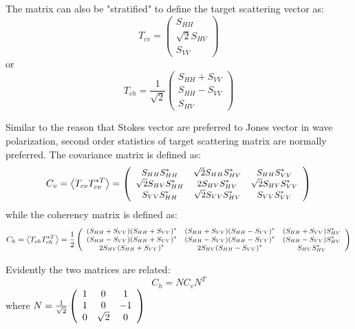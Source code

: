 The matrix can also be "stratified" to define the target scattering vector as: 
\begin{equation}
T_{cv} = \left( 
\begin{array}{c}
 S_{HH} \\
 \sqrt{2} S_{HV} \\
 S_{VV}
\end{array}
 \right) 
\end{equation}
or 
\begin{equation}
T_{ch} = \frac{1}{\sqrt{2}} \left( 
\begin{array}{c}
 S_{HH} + S_{VV}\\
 S_{HH} - S_{VV} \\
 S_{HV}
\end{array}
 \right) 
\end{equation}

Similar to the reason that Stokes vector are preferred to Jones vector in wave polarization, 
	second order statistics of target scattering matrix are normally preferred.
The covariance matrix is defined as:
\begin{equation}
\small{
C_v = \left< T_{cv} T_{cv}^{*T} \right> = 
\left( 
\begin{array}{c c c}
 S_{HH}S_{HH}^* 	& \sqrt{2}S_{HH}S_{HV}^*	& S_{HH}S_{VV}^* \\
 \sqrt{2}S_{HV}S_{HH}^* & 2 S_{HV}S_{HV}^* 		& \sqrt{2}S_{HV}S_{VV}^* \\		
 S_{VV}S_{HH}^*		& \sqrt{2}S_{VV}S_{HV}^*	& S_{VV}S_{VV}^*
\end{array}
 \right) 
}
\end{equation}
while the coherency matrix is defined as:
\begin{equation}
\small{
C_h = \left< T_{ch} T_{ch}^{*T} \right> = \frac{1}{2}
\left( 
\begin{array}{c c c}
 (S_{HH}+S_{VV})(S_{HH}+S_{VV})^* 	& (S_{HH}+S_{VV})(S_{HH}-S_{VV})^*	& (S_{HH}+S_{VV})S_{HV}^* \\
 (S_{HH}-S_{VV})(S_{HH}+S_{VV})^* 	& (S_{HH}-S_{VV})(S_{HH}-S_{VV})^* 	& (S_{HH}-S_{VV})S_{HV}^*\\		
 2S_{HV}(S_{HH}+S_{VV})^*		& 2S_{HV}(S_{HH}-S_{VV})^*		& S_{HV}S_{HV}^*
\end{array}
 \right) 
}
\end{equation}

Evidently the two matrices are related:
\begin{equation}
C_h = N C_v N^T
\end{equation}
where
	$N = \frac{1}{\sqrt{2}}
\left( 
\begin{array}{c c c}
 1 & 0		& 1\\
 1 & 0		& -1\\
 0 & \sqrt{2}	& 0
\end{array}
\right)$ 

